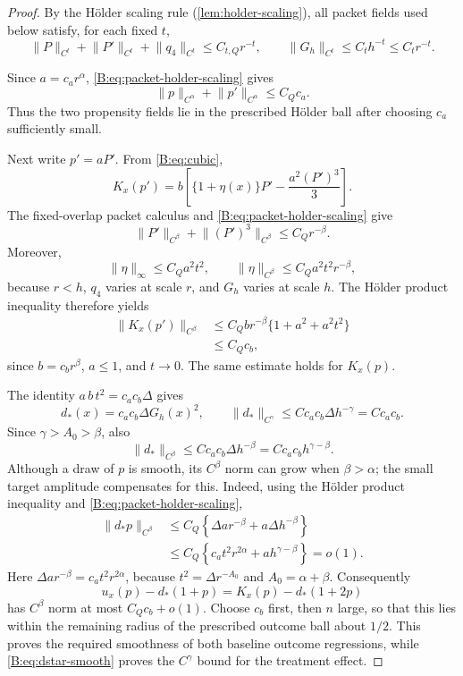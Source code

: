 \documentclass[11pt]{article}
\newcommand{\norm}[1]{\lVert #1\rVert}
\begin{document}
\begin{proof}
By the Hölder scaling rule (\cref{lem:holder-scaling}), all packet fields
used below satisfy, for each fixed \(t\),
\begin{equation}
 \norm P_{C^t}+\norm{P'}_{C^t}+\norm{q_4}_{C^t}
 \le C_{t,Q}r^{-t},
 \qquad
 \norm{G_h}_{C^t}\le C_t h^{-t}\le C_tr^{-t}.
 \label{B:eq:packet-holder-scaling}
\end{equation}

Since \(a=c_ar^\alpha\), \eqref{B:eq:packet-holder-scaling} gives
\[
 \norm p_{C^\alpha}+\norm{p'}_{C^\alpha}
 \le C_Qc_a.
\]
Thus the two propensity fields lie in the prescribed Hölder ball after
choosing \(c_a\) sufficiently small.

Next write \(p'=aP'\).  From \eqref{B:eq:cubic},
\begin{equation}
 K_x(p')
 =b\left[\{1+\eta(x)\}P'-\frac{a^2(P')^3}{3}\right].
 \label{B:eq:k-smoothness}
\end{equation}
The fixed-overlap packet calculus and \eqref{B:eq:packet-holder-scaling} give
\[
 \norm{P'}_{C^\beta}+\norm{(P')^3}_{C^\beta}
 \le C_Qr^{-\beta}.
\]
Moreover,
\[
 \norm\eta_\infty\le C_Qa^2t^2,
 \qquad
 \norm\eta_{C^\beta}\le C_Qa^2t^2r^{-\beta},
\]
because \(r<h\), \(q_4\) varies at scale \(r\), and \(G_h\) varies at
scale \(h\).  The Hölder product inequality therefore yields
\begin{align*}
 \norm{K_x(p')}_{C^\beta}
 &\le C_Qbr^{-\beta}\{1+a^2+a^2t^2\}\\
 &\le C_Qc_b,
\end{align*}
since \(b=c_br^\beta\), \(a\le1\), and \(t\to0\).  The same estimate holds
for \(K_x(p)\).

The identity \(a\,b\,t^2=c_ac_b\Delta\) gives
\begin{equation}
 d_*(x)=c_ac_b\Delta G_h(x)^2,
 \qquad
 \norm{d_*}_{C^\gamma}
 \le Cc_ac_b\Delta h^{-\gamma}=Cc_ac_b.
 \label{B:eq:dstar-smooth}
\end{equation}
Since \(\gamma>A_0>\beta\), also
\[
 \norm{d_*}_{C^\beta}
 \le Cc_ac_b\Delta h^{-\beta}
 =Cc_ac_bh^{\gamma-\beta}.
\]
Although a draw of \(p\) is smooth, its \(C^\beta\) norm can grow when
\(\beta>\alpha\); the small target amplitude compensates for this.  Indeed,
using the Hölder product inequality and
\eqref{B:eq:packet-holder-scaling},
\begin{align*}
 \norm{d_*p}_{C^\beta}
 &\le C_Q\left\{
   \Delta a r^{-\beta}+a\Delta h^{-\beta}
   \right\}\\
 &\le C_Q\left\{c_at^2r^{2\alpha}
          +a h^{\gamma-\beta}\right\}
 =o(1).
\end{align*}
Here
\(\Delta a r^{-\beta}=c_at^2r^{2\alpha}\), because
\(t^2=\Delta r^{-A_0}\) and \(A_0=\alpha+\beta\).  Consequently
\[
 u_x(p)-d_*(1+p)=K_x(p)-d_*(1+2p)
\]
has \(C^\beta\) norm at most \(C_Qc_b+o(1)\).  Choose \(c_b\)
first, then \(n\) large, so that this lies within the remaining radius of
the prescribed outcome ball about \(1/2\).  This proves the required
smoothness of both baseline outcome regressions, while
\eqref{B:eq:dstar-smooth} proves the \(C^\gamma\) bound for the treatment
effect.


\end{proof}
\end{document}
